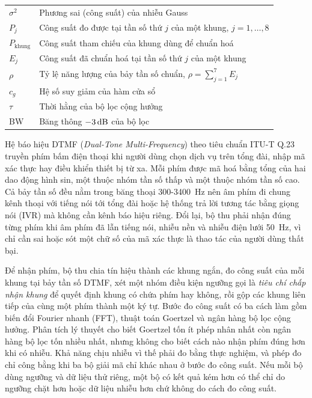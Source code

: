 \documentclass{dtmf_report}
\begin{document}
{\begin{longtable}{@{}p{2cm} p{\dimexpr\linewidth-2cm-2\tabcolsep\relax}@{}}
$\sigma^{2}$ & Phương sai (công suất) của nhiễu Gauss \\
$P_{j}$      & Công suất đo được tại tần số thứ $j$ của một khung, $j = 1, \dots, 8$ \\
$P_{\text{khung}}$ & Công suất tham chiếu của khung dùng để chuẩn hoá \\
$E_{j}$      & Công suất đã chuẩn hoá tại tần số thứ $j$ của một khung \\
$\rho$       & Tỷ lệ năng lượng của bảy tần số chuẩn, $\rho = \sum_{j=1}^{7} E_{j}$ \\
$c_{g}$      & Hệ số suy giảm của hàm cửa sổ \\
$\tau$       & Thời hằng của bộ lọc cộng hưởng \\
BW           & Băng thông $-3\,\mathrm{dB}$ của bộ lọc \\
\bottomrule
\end{longtable}}

\danhmucbang
\danhmuchinh
\clearpage




Hệ báo hiệu DTMF (\emph{Dual-Tone Multi-Frequency}) theo tiêu chuẩn \mbox{ITU-T} Q.23~\cite{itu_q23} truyền phím bấm điện thoại khi người dùng chọn dịch vụ trên tổng đài, nhập mã xác thực hay điều khiển thiết bị từ xa. Mỗi phím được mã hoá bằng tổng của hai dao động hình sin, một thuộc nhóm tần số thấp và một thuộc nhóm tần số cao. Cả bảy tần số đều nằm trong băng thoại 300-3400~Hz nên âm phím đi chung kênh thoại với tiếng nói tới tổng đài hoặc hệ thống trả lời tương tác bằng giọng nói (IVR) mà không cần kênh báo hiệu riêng. Đổi lại, bộ thu phải nhận đúng từng phím khi âm phím đã lẫn tiếng nói, nhiễu nền và nhiễu điện lưới 50~Hz, vì chỉ cần sai hoặc sót một chữ số của mã xác thực là thao tác của người dùng thất bại.

Để nhận phím, bộ thu chia tín hiệu thành các khung ngắn, đo công suất của mỗi khung tại bảy tần số DTMF, xét một nhóm điều kiện ngưỡng gọi là \emph{tiêu chí chấp nhận khung} để quyết định khung có chứa phím hay không, rồi gộp các khung liên tiếp của cùng một phím thành một ký tự. Bước đo công suất có ba cách làm gồm biến đổi Fourier nhanh (FFT), thuật toán Goertzel và ngân hàng bộ lọc cộng hưởng. Phân tích lý thuyết cho biết Goertzel tốn ít phép nhân nhất còn ngân hàng bộ lọc tốn nhiều nhất, nhưng không cho biết cách nào nhận phím đúng hơn khi có nhiễu. Khả năng chịu nhiễu vì thế phải đo bằng thực nghiệm, và phép đo chỉ công bằng khi ba bộ giải mã chỉ khác nhau ở bước đo công suất. Nếu mỗi bộ dùng ngưỡng và dữ liệu thử riêng, một bộ có kết quả kém hơn có thể chỉ do ngưỡng chặt hơn hoặc dữ liệu nhiễu hơn chứ không do cách đo công suất.
\end{document}

